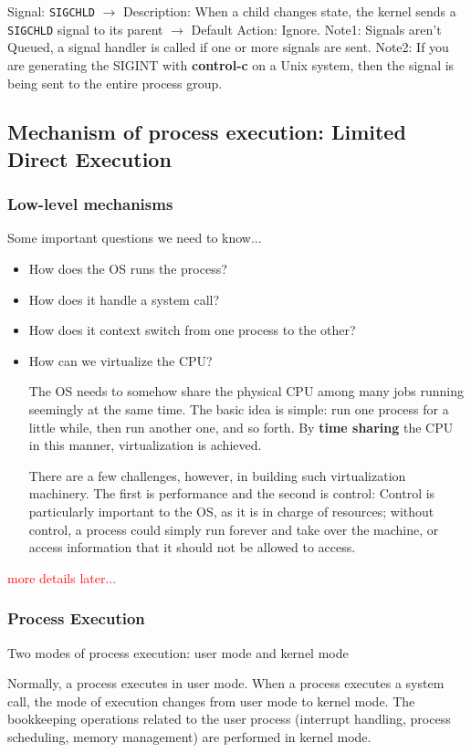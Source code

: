\documentclass{article}
\begin{document}
Signal: \texttt{SIGCHLD} $\rightarrow$ Description: When a child changes state, the kernel sends a \texttt{SIGCHLD} signal to its parent $\rightarrow$ Default Action: Ignore.
Note1: Signals aren't Queued, a signal handler is called if one or more signals are sent.
Note2: If you are generating the SIGINT with \textbf{control-c} on a Unix system, then the signal is being sent to the entire process group.

\subsection{Mechanism of process execution: Limited Direct Execution}
\subsubsection{Low-level mechanisms}
Some important questions we need to know...
\begin{itemize}
    \item How does the OS runs the process?
    \item How does it handle a system call?
    \item How does it context switch from one process to the other?
    \item How can we virtualize the CPU?

    The OS needs to somehow share the physical CPU among many jobs running seemingly at the same time. The basic idea is simple: run one process for a little while, then run another one, and so forth. By \textbf{time sharing} the CPU in this manner, virtualization is achieved.

    There are a few challenges, however, in building such virtualization machinery. The first is performance and the second is control: Control is particularly important to the OS, as it is in charge of resources; without control, a process could simply run forever and take over the machine, or access information that it should not be allowed to access.

    
\end{itemize}
\textcolor{red}{more details later...}

\subsubsection{Process Execution}
Two modes of process execution: user mode and kernel mode

Normally, a process executes in user mode. When a process executes a system call, the mode of execution changes from user mode to kernel mode. The bookkeeping operations related to the user process (interrupt handling, process scheduling, memory management) are performed in kernel mode.\\
\end{document}
